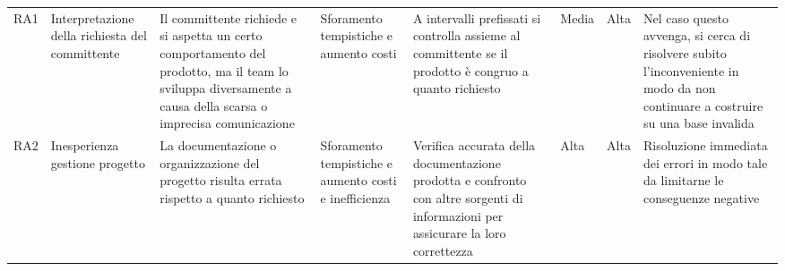 \begin{landscape}
\begin{longtable}{p{0.6cm}|p{2.2cm}|p{3.2cm}|p{2cm}|p{4cm}|p{0.9cm}|p{0.8cm}|p{4cm}}
		RA1 & Interpretazione della richiesta del committente & Il committente richiede e si aspetta un certo comportamento del prodotto, ma il team lo sviluppa diversamente a causa della scarsa o imprecisa comunicazione & Sforamento tempistiche e aumento costi & A intervalli prefissati si controlla assieme al committente se il prodotto è congruo a quanto richiesto & Media & Alta & Nel caso questo avvenga, si cerca di risolvere subito l’inconveniente in modo da non continuare a costruire su una base invalida \\
		RA2 & Inesperienza gestione progetto & La documentazione o organizzazione del progetto risulta errata rispetto a quanto richiesto & Sforamento tempistiche e aumento costi e inefficienza & Verifica accurata della documentazione prodotta e confronto con altre sorgenti di informazioni per assicurare la loro correttezza & Alta & Alta & Risoluzione immediata dei errori in modo tale da limitarne le conseguenze negative \\   
	\end{longtable}
\end{landscape}

